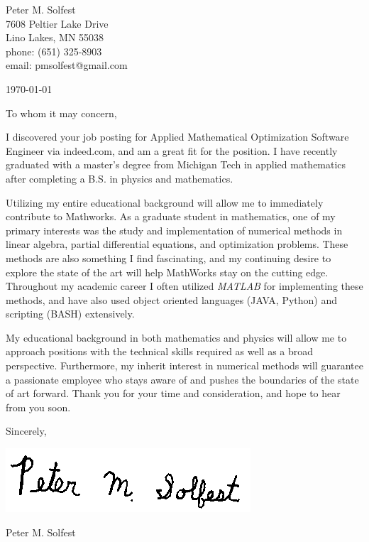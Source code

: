 \documentclass[letterpaper,12pt]{article}
\begin{document}
Peter M. Solfest\\
7608 Peltier Lake Drive\\
Lino Lakes, MN 55038\\
phone: (651) 325-8903\\
email: pmsolfest@gmail.com

\today


To whom it may concern, %

I discovered your job posting for Applied Mathematical Optimization Software Engineer
via indeed.com,
 and am a great fit for the position.
I have recently graduated with a master's degree from Michigan Tech in applied mathematics after
completing a B.S. in physics and mathematics.

Utilizing my entire educational background will allow me to immediately
contribute to Mathworks.
As a graduate student in mathematics, one of my primary interests was the study and
implementation of numerical methods in linear algebra, partial differential equations,
and optimization problems.
These methods are also something I find fascinating, and my continuing desire to explore
the state of the art will help MathWorks stay on the cutting edge.
Throughout my academic career I often utilized \textit{MATLAB} for implementing these methods,
and have also used object oriented languages (JAVA, Python) and scripting (BASH) extensively.


My educational background in both mathematics and physics will allow 
me to approach positions with the technical skills required as well as a broad perspective.
Furthermore, my inherit interest in numerical methods will guarantee a passionate employee
who stays aware of and pushes the boundaries of the state of art forward.
Thank you for your time and consideration, and hope to hear from you soon.

Sincerely,

\includegraphics[height=.5in]{signature.png}

Peter M. Solfest
\end{document}
